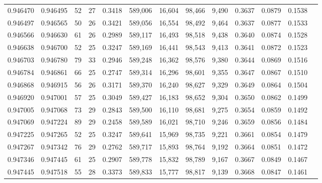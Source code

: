 \begin{tabular}{rrrrrrrrrrrrr}
0.946470 & 0.946495 &    52 &  27 &                                     0.3418 & 589,006 &  16,604 &  98,466 &   9,490 & 0.3637 & 0.0879 & 0.1538 \\
0.946497 & 0.946565 &    50 &  26 &                                     0.3421 & 589,056 &  16,554 &  98,492 &   9,464 & 0.3637 & 0.0877 & 0.1533 \\
0.946566 & 0.946630 &    61 &  26 &                                     0.2989 & 589,117 &  16,493 &  98,518 &   9,438 & 0.3640 & 0.0874 & 0.1528 \\
0.946638 & 0.946700 &    52 &  25 &                                     0.3247 & 589,169 &  16,441 &  98,543 &   9,413 & 0.3641 & 0.0872 & 0.1523 \\
0.946703 & 0.946780 &    79 &  33 &                                     0.2946 & 589,248 &  16,362 &  98,576 &   9,380 & 0.3644 & 0.0869 & 0.1516 \\
0.946784 & 0.946861 &    66 &  25 &                                     0.2747 & 589,314 &  16,296 &  98,601 &   9,355 & 0.3647 & 0.0867 & 0.1510 \\
0.946868 & 0.946915 &    56 &  26 &                                     0.3171 & 589,370 &  16,240 &  98,627 &   9,329 & 0.3649 & 0.0864 & 0.1504 \\
0.946920 & 0.947001 &    57 &  25 &                                     0.3049 & 589,427 &  16,183 &  98,652 &   9,304 & 0.3650 & 0.0862 & 0.1499 \\
0.947005 & 0.947068 &    73 &  29 &                                     0.2843 & 589,500 &  16,110 &  98,681 &   9,275 & 0.3654 & 0.0859 & 0.1492 \\
0.947069 & 0.947224 &    89 &  29 &                                     0.2458 & 589,589 &  16,021 &  98,710 &   9,246 & 0.3659 & 0.0856 & 0.1484 \\
0.947225 & 0.947265 &    52 &  25 &                                     0.3247 & 589,641 &  15,969 &  98,735 &   9,221 & 0.3661 & 0.0854 & 0.1479 \\
0.947267 & 0.947342 &    76 &  29 &                                     0.2762 & 589,717 &  15,893 &  98,764 &   9,192 & 0.3664 & 0.0851 & 0.1472 \\
0.947346 & 0.947445 &    61 &  25 &                                     0.2907 & 589,778 &  15,832 &  98,789 &   9,167 & 0.3667 & 0.0849 & 0.1467 \\
0.947445 & 0.947518 &    55 &  28 &                                     0.3373 & 589,833 &  15,777 &  98,817 &   9,139 & 0.3668 & 0.0847 & 0.1461 \\

\end{tabular}
